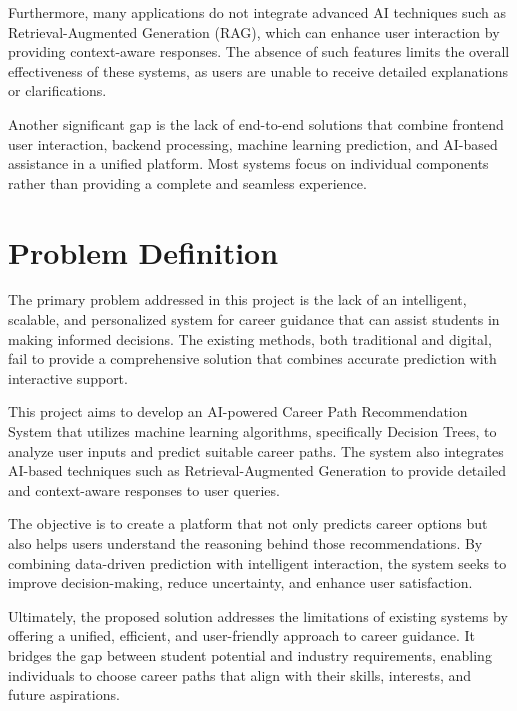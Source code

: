 \documentclass[12pt,a4paper]{report}
\begin{document}
{Furthermore, many applications do not integrate advanced AI techniques such as Retrieval-Augmented Generation (RAG), which can enhance user interaction by providing context-aware responses. The absence of such features limits the overall effectiveness of these systems, as users are unable to receive detailed explanations or clarifications.

Another significant gap is the lack of end-to-end solutions that combine frontend user interaction, backend processing, machine learning prediction, and AI-based assistance in a unified platform. Most systems focus on individual components rather than providing a complete and seamless experience.

\section{Problem Definition}

The primary problem addressed in this project is the lack of an intelligent, scalable, and personalized system for career guidance that can assist students in making informed decisions. The existing methods, both traditional and digital, fail to provide a comprehensive solution that combines accurate prediction with interactive support.

This project aims to develop an AI-powered Career Path Recommendation System that utilizes machine learning algorithms, specifically Decision Trees, to analyze user inputs and predict suitable career paths. The system also integrates AI-based techniques such as Retrieval-Augmented Generation to provide detailed and context-aware responses to user queries.

The objective is to create a platform that not only predicts career options but also helps users understand the reasoning behind those recommendations. By combining data-driven prediction with intelligent interaction, the system seeks to improve decision-making, reduce uncertainty, and enhance user satisfaction.

Ultimately, the proposed solution addresses the limitations of existing systems by offering a unified, efficient, and user-friendly approach to career guidance. It bridges the gap between student potential and industry requirements, enabling individuals to choose career paths that align with their skills, interests, and future aspirations.


\clearpage
}
\end{document}
